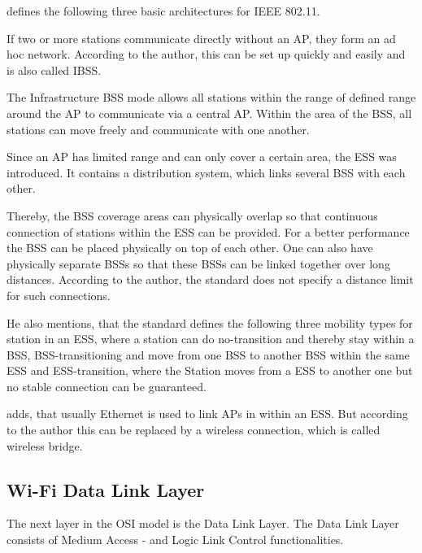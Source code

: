 \documentclass[]{nsm-thesis}
\begin{document}
\textcite{kauffels_wireless_2002} defines the following three basic architectures for IEEE 802.11.

If two or more stations communicate directly without an AP, they form an ad hoc network. According to the author, this can be set up quickly and easily and is also called \ac{IBSS}.

The Infrastructure \ac{BSS} mode allows all stations within the range of defined range around the \ac{AP} to communicate via a central \ac{AP}. Within the area of the \ac{BSS}, all stations can move freely and communicate with one another.

Since an \ac{AP} has limited range and can only cover a certain area, the \ac{ESS} was introduced. It contains a distribution system, which links several \ac{BSS} with each other.

Thereby, the BSS coverage areas can physically overlap so that continuous connection of stations within the ESS can be provided. For a better performance the \ac{BSS} can be placed physically on top of each other. One can also have physically separate \ac{BSS}s so that these \ac{BSS}s can be linked together over long distances. According to the author, the standard does not specify a distance limit for such connections. 

He also mentions, that the standard defines the following three mobility types for station in an \ac{ESS}, where a station can do no-transition and thereby stay within a \ac{BSS}, \ac{BSS}-transitioning and move from one \ac{BSS} to another \ac{BSS} within the same \ac{ESS} and \ac{ESS}-transition, where the Station moves from a \ac{ESS} to another one but no stable connection can be guaranteed.

\textcite{sauter_wireless_2022} adds, that usually Ethernet is used to link \ac{AP}s in within an \ac{ESS}. But according to the author this can be replaced by a wireless connection, which is called wireless bridge.





\subsection*{Wi-Fi Data Link Layer}

The next layer in the OSI model is the Data Link Layer.
The Data Link Layer consists of Medium Access - and Logic Link Control functionalities.
\end{document}
